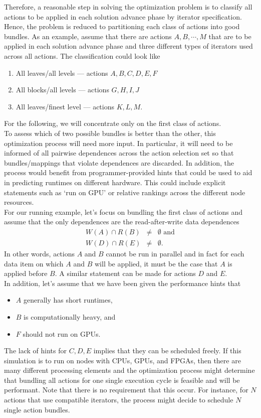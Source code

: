 \documentclass{article}
\begin{document}
Therefore, a reasonable step in solving the optimization problem is to classify
all actions to be applied in each solution advance phase by iterator
specification.  Hence, the problem is reduced to partitioning each class of
actions into good bundles.  As an example, assume that there are actions $A, B,
\cdots, M$ that are to be applied in each solution advance phase and three
different types of iterators used across all actions.  The classification could
look like
\begin{enumerate}
\item{All leaves/all levels --- actions $A, B, C, D, E, F$}
\item{All blocks/all levels --- actions $G, H, I, J$}
\item{All leaves/finest level --- actions $K,L,M$}.
\end{enumerate}
For the following, we will concentrate only on the first class of actions.\\

To assess which of two possible bundles is better than the other, this
optimization process will need more input.  In particular, it will need to be
informed of all pairwise dependences across the action selection set so that
bundles/mappings that violate dependences are discarded.  In addition, the
process would benefit from programmer-provided hints that could be used to aid
in predicting runtimes on different hardware.  This could include explicit
statements such as `run on GPU' or relative rankings across the different node
resources.\\

For our running example, let's focus on bundling the first class of actions and
assume that the only dependences are the read-after-write data dependences
\begin{eqnarray*}
W(A) \cap R(B) & \not= & \emptyset\text{ and}\\
W(D) \cap R(E) & \not= & \emptyset.
\end{eqnarray*}
In other words, actions $A$ and $B$ cannot be run in parallel and in fact for each
data item on which $A$ and $B$ will be applied, it must be the case that $A$ is
applied before $B$.  A similar statement can be made for actions $D$ and $E$.\\

In addition, let's assume that we have been given the performance hints that
\begin{itemize}
\item{$A$ generally has short runtimes,}
\item{$B$ is computationally heavy, and}
\item{$F$ should not run on GPUs.}
\end{itemize}
The lack of hints for $C,D,E$ implies that they can be scheduled freely.
If this simulation is to run on nodes with CPUs, GPUs, and FPGAs, then there are
many different processing elements and the optimization process might determine
that bundling all actions for one single \OR execution cycle is feasible and
will be performant.  Note that there is no requirement that this occur.  For
instance, for $N$ actions that use compatible iterators, the process might
decide to schedule $N$ single action bundles.
\end{document}
